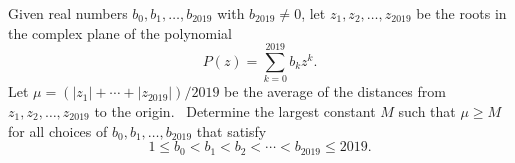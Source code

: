 Given real numbers $b_0,b_1,\ldots, b_{2019}$ with $b_{2019}\neq 0$, let $z_1,z_2,\ldots, z_{2019}$ be the roots in the complex plane of the polynomial
\[
P(z) = \sum_{k=0}^{2019}b_kz^k.
\]Let $\mu = (|z_1|+ \cdots + |z_{2019}|)/2019$ be the average of the distances from $z_1,z_2,\ldots, z_{2019}$ to the origin.  Determine the largest constant $M$ such that $\mu\geq M$ for all choices of $b_0,b_1,\ldots, b_{2019}$ that satisfy
\[
1\leq b_0 < b_1 < b_2 < \cdots < b_{2019} \leq 2019.
\]